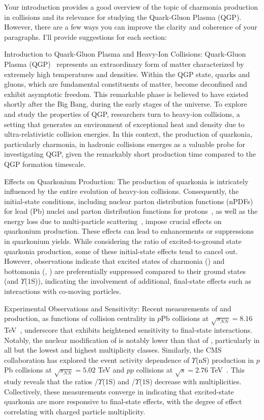 
Your introduction provides a good overview of the topic of charmonia production in collisions and its relevance for studying the Quark-Gluon Plasma (QGP). However, there are a few ways you can improve the clarity and coherence of your paragraphs. I'll provide suggestions for each section:

Introduction to Quark-Gluon Plasma and Heavy-Ion Collisions:
Quark-Gluon Plasma (QGP)~\cite{Satz_2011} represents an extraordinary form of matter characterized by extremely high temperatures and densities. Within the QGP state, quarks and gluons, which are fundamental constituents of matter, become deconfined and exhibit asymptotic freedom. This remarkable phase is believed to have existed shortly after the Big Bang, during the early stages of the universe. To explore and study the properties of QGP, researchers turn to heavy-ion collisions, a setting that generates an environment of exceptional heat and density due to ultra-relativistic collision energies. In this context, the production of quarkonia, particularly charmonia, in hadronic collisions emerges as a valuable probe for investigating QGP, given the remarkably short production time compared to the QGP formation timescale.

Effects on Quarkonium Production:
The production of quarkonia is intricately influenced by the entire evolution of heavy-ion collisions. Consequently, the initial-state conditions, including nuclear parton distribution functions (nPDFs) for lead (Pb) nuclei and parton distribution functions for protons~\cite{AtashbarTehrani:2017mzi}, as well as the energy loss due to multi-particle scattering~\cite{Arleo:2014oha}, impose crucial effects on quarkonium production. These effects can lead to enhancements or suppressions in quarkonium yields. While considering the ratio of excited-to-ground state quarkonia production, some of these initial-state effects tend to cancel out. However, observations indicate that excited states of charmonia (\psitwos) and bottomonia (\TwoS, \ThreeS) are preferentially suppressed compared to their ground states (\jpsi and $\Upsilon$(1S))\cite{LHCb:2018psc,ALICE:2020vjy, LHCb:2016vqr}, indicating the involvement of additional, final-state effects such as interactions with co-moving particles\cite{Ferreiro:2012rq}.

Experimental Observations and Sensitivity:
Recent measurements of \jpsi and \psitwos production, as functions of collision centrality in $p$Pb collisions at $\sqrt{s_{NN}}=8.16$ TeV~\cite{ALICE:2020tsj}, underscore that \psitwos exhibits heightened sensitivity to final-state interactions. Notably, the nuclear modification of \psitwos is notably lower than that of \jpsi, particularly in all but the lowest and highest multiplicity classes. Similarly, the CMS collaboration has explored the event activity dependence of $\Upsilon$(nS) production in $p$Pb collisions at $\sqrt{s_{NN}}=5.02$ TeV and $pp$ collisions at $\sqrt{s}=2.76$ TeV~\cite{CMS:2013jsu}. This study reveals that the ratios \TwoS/$\Upsilon$(1S) and \ThreeS/$\Upsilon$(1S) decrease with multiplicities. Collectively, these measurements converge in indicating that excited-state quarkonia are more responsive to final-state effects, with the degree of effect correlating with charged particle multiplicity.

